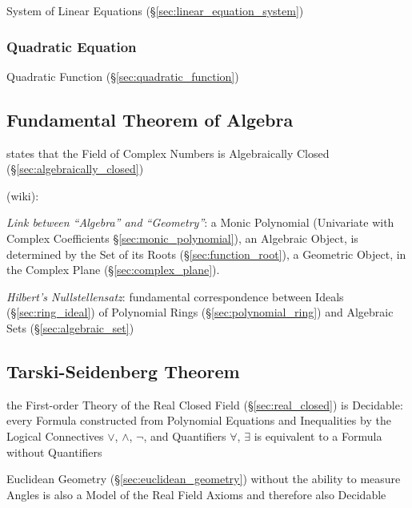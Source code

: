 System of Linear Equations (\S\ref{sec:linear_equation_system})



\subsubsection{Quadratic Equation}\label{sec:quadratic_equation}

Quadratic Function (\S\ref{sec:quadratic_function})



\subsection{Fundamental Theorem of Algebra}
\label{sec:fundamental_algebra_theorem}

states that the Field of Complex Numbers is Algebraically Closed
(\S\ref{sec:algebraically_closed})

(wiki):

\emph{Link between ``Algebra'' and ``Geometry''}: a Monic Polynomial
(Univariate with Complex Coefficients \S\ref{sec:monic_polynomial}), an
Algebraic Object, is determined by the Set of its Roots
(\S\ref{sec:function_root}), a Geometric Object, in the Complex Plane
(\S\ref{sec:complex_plane}).

\emph{Hilbert's Nullstellensatz}: fundamental correspondence between Ideals
(\S\ref{sec:ring_ideal}) of Polynomial Rings (\S\ref{sec:polynomial_ring}) and
Algebraic Sets (\S\ref{sec:algebraic_set})



\subsection{Tarski-Seidenberg Theorem}\label{sec:tarski_seidenberg}

the First-order Theory of the Real Closed Field (\S\ref{sec:real_closed}) is
Decidable: every Formula constructed from Polynomial Equations and Inequalities
by the Logical Connectives $\vee$, $\wedge$, $\neg$, and Quantifiers $\forall$,
$\exists$ is equivalent to a Formula without Quantifiers

Euclidean Geometry (\S\ref{sec:euclidean_geometry}) without the ability to
measure Angles is also a Model of the Real Field Axioms and therefore also
Decidable

